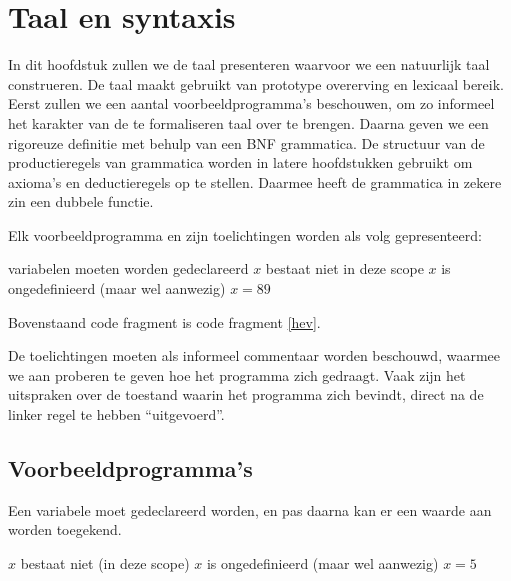 
\chapter{Taal en syntaxis}

In dit hoofdstuk zullen we de taal presenteren waarvoor we een natuurlijk taal construeren. De taal maakt gebruikt van prototype overerving en lexicaal bereik. Eerst zullen we een aantal voorbeeldprogramma's beschouwen, om zo informeel het karakter van de te formaliseren taal over te brengen. Daarna geven we een rigoreuze definitie met behulp van een BNF grammatica. De structuur van de productieregels van grammatica worden in latere hoofdstukken gebruikt om axioma's en deductieregels op te stellen. Daarmee heeft de grammatica in zekere zin een dubbele functie.

Elk voorbeeldprogramma en zijn toelichtingen worden als volg gepresenteerd:

	\begin{CodeFragment}\label{hev}
		                      {variabelen moeten worden gedeclareerd}
		      {}
		                  {}
		    {}
		\Line{}             {$x$ bestaat niet in deze scope}
		                      {$x$ is ongedefinieerd (maar wel aanwezig)}
		                   {$x = 89$}
	\end{CodeFragment}

Bovenstaand code fragment is code fragment \ref{hev}.

De toelichtingen moeten als informeel commentaar worden beschouwd, waarmee we aan proberen te geven hoe het programma zich gedraagt. Vaak zijn het uitspraken over de toestand waarin het programma zich bevindt, direct na de linker regel te hebben ``uitgevoerd''.

\section{Voorbeeldprogramma's}

Een variabele moet gedeclareerd worden, en pas daarna kan er een waarde aan worden toegekend.

	\begin{CodeFragment}
		\Line{}                            {$x$ bestaat niet (in deze scope)}
		                      {$x$ is ongedefinieerd (maar wel aanwezig)}
		                       {$x = 5$}
	\end{CodeFragment}

